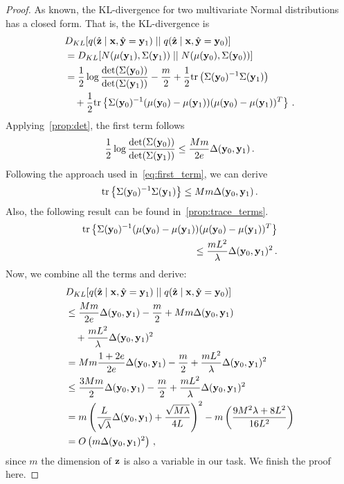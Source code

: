 {\begin{proof}
As known, the KL-divergence for two multivariate Normal distributions has a closed form.
That is, the KL-divergence is 
\begin{align}
&D_{KL} [ q(\hat{\mathbf{z}} \mid \mathbf{x}, \hat{\mathbf{y}}=\mathbf{y}_1) \mid \mid q(\hat{\mathbf{z}} \mid \mathbf{x}, \hat{\mathbf{y}}=\mathbf{y}_0)] \\
&=D_{KL} [ N(\mu(\mathbf{y}_1), \Sigma(\mathbf{y}_1)) \mid \mid N(\mu(\mathbf{y}_0), \Sigma(\mathbf{y}_0))] \notag \\
&= \frac 1 2 \log\frac{\mathrm{det}(\Sigma(\mathbf{y}_0))}{\mathrm{det}(\Sigma(\mathbf{y}_1))} - \frac{m}{2} + \frac 1 2 \mathrm{tr} \left( \Sigma(\mathbf{y}_0)^{-1} \Sigma(\mathbf{y}_1) \right) \notag \\
&\quad + \frac 1 2 \mathrm{tr} \left\{ \Sigma(\mathbf{y}_0)^{-1} (\mu(\mathbf{y}_0) - \mu(\mathbf{y}_1)) (\mu(\mathbf{y}_0) - \mu(\mathbf{y}_1))^T  \right\} \,.
\end{align}
Applying~\cref{prop:det}, the first term follows
\begin{align}
\frac 1 2 \log\frac{\mathrm{det}(\Sigma(\mathbf{y}_0))}{\mathrm{det}(\Sigma(\mathbf{y}_1))} \le \frac{Mm}{2e} \Delta(\mathbf{y}_0, \mathbf{y}_1) \,.
\end{align}
Following the approach used in~\cref{eq:first_term}, we can derive
\begin{align}
\mathrm{tr} \left\{ \Sigma(\mathbf{y}_0)^{-1}  \Sigma(\mathbf{y}_1) \right\} 
\le M m \Delta(\mathbf{y}_0, \mathbf{y}_1)  \,.
\end{align}
Also, the following result can be found in~\cref{prop:trace_terms}.
\begin{align}
\mathrm{tr} \left\{ \Sigma(\mathbf{y}_0)^{-1} (\mu(\mathbf{y}_0) - \mu(\mathbf{y}_1)) (\mu(\mathbf{y}_0) - \mu(\mathbf{y}_1))^T  \right\} \notag \\
\le \frac{m L^2}{\lambda} \Delta(\mathbf{y}_0, \mathbf{y}_1)^2 \,.
\end{align}
Now, we combine all the terms and derive: 
\begin{align}
&D_{KL} [ q(\hat{\mathbf{z}} \mid \mathbf{x}, \hat{\mathbf{y}}=\mathbf{y}_1) \mid \mid q(\hat{\mathbf{z}} \mid \mathbf{x}, \hat{\mathbf{y}}=\mathbf{y}_0)] \notag \\
&\le \frac{M m}{2e} \Delta(\mathbf{y}_0, \mathbf{y}_1) - \frac{m}{2} + {M m} \Delta(\mathbf{y}_0, \mathbf{y}_1) \\
&\quad + \frac{m L^2}{\lambda} \Delta(\mathbf{y}_0, \mathbf{y}_1)^2 \notag \\
&= Mm \frac{1+2e}{2e} \Delta(\mathbf{y}_0, \mathbf{y}_1) - \frac{m}{2} + \frac{m L^2}{\lambda} \Delta(\mathbf{y}_0, \mathbf{y}_1)^2 \notag \\
&\le \frac{3Mm}{2} \Delta(\mathbf{y}_0, \mathbf{y}_1) - \frac{m}{2} + \frac{m L^2}{\lambda} \Delta(\mathbf{y}_0, \mathbf{y}_1)^2 \notag \\ 
&= m \left(\frac{L}{\sqrt{\lambda}} \Delta(\mathbf{y}_0, \mathbf{y}_1) + \frac{\sqrt{M \lambda}}{4 L} \right)^2 - m \left( \frac{9 M^2 \lambda + 8 L^2}{16 L^2} \right) \notag \\
&=O \left( m \Delta(\mathbf{y}_0, \mathbf{y}_1)^2 \right) \,,
\end{align}
since $m$ the dimension of $\mathbf{z}$ is also a variable in our task.
We finish the proof here.
\end{proof}

}
